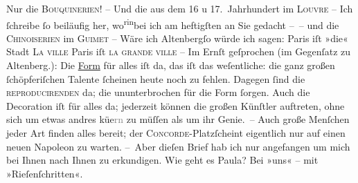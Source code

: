 \begin{ledgroupsized}[t]{13cm}
           \pstart
           Nur die \textsc{Bouquinerien}! – Und die \label{K_L00670_1v}\label{K_L00670_1h} aus dem 16 u
               17. Jahrhundert im \textsc{Louvre} – \pend
           \pstart
           Ich ſchreibe ſo beiläufig her, wo\substVorne{}\textsuperscript{rin}\substDazwischen{}bei\substHinten{} ich am
               heftigſten an Sie gedacht – {\pb}– und die \textsc{Chinoiserien} im \textsc{Guimet} –\pend
           \pstart
           Wäre ich Altenbergſo würde ich sagen:\pend
           \pstart
           Paris iſt »die« Stadt {\dotsfive}{ }\textsc{La ville}{ }{\dotsseven}\pend
           \pstart
           Paris iſt \textsc{la grande ville}{ }{\dotsfour}\pend
           \pstart
           \numberlinefalse{}–\numberlinetrue{}\pend
           \pstart
           Im Ernſt geſprochen (im Gegenſatz zu Altenberg.):
               Die \uline{Form} für alles iſt da, \introOben{}das
                  iſt\introOben{} das weſentliche: die ganz {\pb}großen
                  \introOben{}ſchöpferiſchen\introOben{} Talente ſcheinen heute noch zu fehlen.
               Dagegen ſind die \textsc{reproducirenden} da; die ununterbrochen für
               die Form ſorgen. Auch die Decoration iſt für alles da; jederzeit können die großen
               Künſtler auftreten, ohne sich um etwas andres kü{\geminationm}e\textcolor{gray}{rn} zu
               müſſen als um ihr Genie. – Auch große Menſchen {\pb}jeder Art finden alles bereit; der \textsc{Concorde}-Platzſcheint
               eigentlich nur auf einen neuen Napoleon zu warten.\pend
           \pstart
           – Aber dieſen Brief hab ich nur angefangen um mich bei Ihnen nach Ihnen zu
               erkundigen. Wie geht es Paula? Bei »uns« – mit »Rieſen{\pb}ſchritten«.\pend

\end{ledgroupsized}
